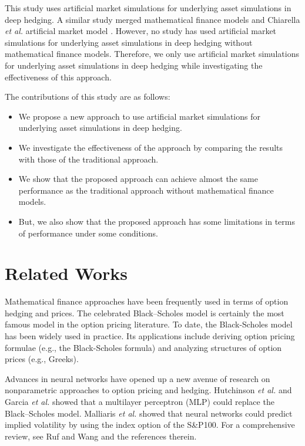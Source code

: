 This study uses artificial market simulations for underlying asset simulations in deep hedging.
A similar study \cite{Gao2023} merged mathematical finance models and Chiarella {\it et al.} artificial market model \cite{CI2002}.
However, no study has used artificial market simulations for underlying asset simulations in deep hedging without mathematical finance models.
Therefore, we only use artificial market simulations for underlying asset simulations in deep hedging while investigating the effectiveness of this approach.

The contributions of this study are as follows:
\begin{itemize}
    \item We propose a new approach to use artificial market simulations for underlying asset simulations in deep hedging.
    \item We investigate the effectiveness of the approach by comparing the results with those of the traditional approach.
    \item We show that the proposed approach can achieve almost the same performance as the traditional approach without mathematical finance models.
    \item But, we also show that the proposed approach has some limitations in terms of performance under some conditions.
\end{itemize}

\section{Related Works}
Mathematical finance approaches have been frequently used in terms of option hedging and prices.
The celebrated Black--Scholes model \cite{black1973,merton1973} is certainly the most famous model in the option pricing literature.
To date, the Black-Scholes model has been widely used in practice.
Its applications include deriving option pricing formulae (e.g., the Black-Scholes formula) and analyzing structures of option prices (e.g., Greeks).

Advances in neural networks have opened up a new avenue of research on nonparametric approaches to option pricing and hedging.
Hutchinson {\it et al.} \cite{Hutchinson1994} and Garcia {\it et al.} \cite{Garcia2000} showed that a multilayer perceptron (MLP) could replace the Black--Scholes model.
Malliaris {\it et al.} \cite{Malliaris1996} showed that neural networks could predict implied volatility by using the index option of the S\&P100.
For a comprehensive review, see Ruf and Wang \cite{Ruf2020} and the references therein.

